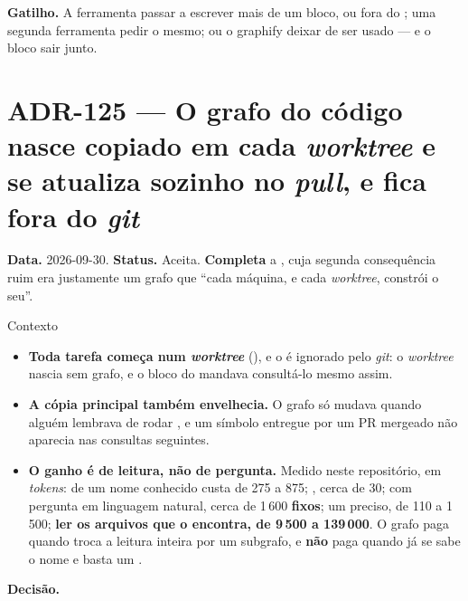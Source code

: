 \textbf{Gatilho.} A ferramenta passar a escrever mais de um bloco, ou fora do
; uma segunda ferramenta pedir o mesmo; ou o graphify deixar de ser
usado --- e o bloco sair junto.

\section{ADR-125 --- O grafo do código nasce copiado em cada \emph{worktree} e se atualiza sozinho no \emph{pull}, e fica fora do \emph{git}}
\label{adr:grafo-nas-worktrees}

\textbf{Data.} 2026-09-30. \textbf{Status.} Aceita.
\textbf{Completa} a , cuja segunda consequência ruim era justamente um
grafo que \enquote{cada máquina, e cada \emph{worktree}, constrói o seu}.

\begin{especificacao}{Contexto}
\begin{itemize}
  \item \textbf{Toda tarefa começa num \emph{worktree}} (), e o
     é ignorado pelo \emph{git}: o \emph{worktree} nascia sem grafo,
    e o bloco do  mandava consultá-lo mesmo assim.
  \item \textbf{A cópia principal também envelhecia.} O grafo só mudava quando alguém
    lembrava de rodar , e um símbolo entregue por um PR mergeado
    não aparecia nas consultas seguintes.
  \item \textbf{O ganho é de leitura, não de pergunta.} Medido neste repositório, em
    \emph{tokens}:  de um nome conhecido custa de 275 a 875; , cerca
    de 30;  com pergunta em linguagem natural, cerca de 1\,600 \textbf{fixos};
    um  preciso, de 110 a 1\,500; \textbf{ler os arquivos que o 
    encontra, de 9\,500 a 139\,000}. O grafo paga quando troca a leitura inteira por um
    subgrafo, e \textbf{não} paga quando já se sabe o nome e basta um .
\end{itemize}
\end{especificacao}

\textbf{Decisão.}

